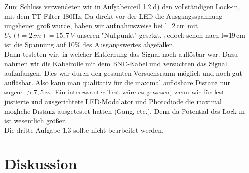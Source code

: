 \documentclass{scrartcl}						%
\begin{document}
\begin{figure}[h!t!]
			\end{figure}
			Zum Schluss verwendeten wir in Aufgabenteil 1.2.d) den vollständigen Lock-in, mit dem TT-Filter 180Hz. Da direkt vor der LED die Ausgangsspannung ungeheuer groß wurde, haben wir außnahmsweise bei l=2\,cm mit $ U_2(l=2cm)=15,7\,V $ unseren "Nullpunkt" gesetzt. Jedoch schon nach l=19\,cm ist die Spannung auf 10\% des Ausgangswertes abgefallen. \\
			Dann testeten wir, in welcher Entfernung das Signal noch auflösbar war. Dazu nahmen wir die Kabelrolle mit dem BNC-Kabel und versuchten das Signal aufzufangen. Dies war durch den gesamten Versuchsraum möglich und noch gut auflösbar. Also kann man qualitativ für die maximal auflösbare Distanz nur sagen: $ >7,5\,m $. Ein interessanter Test wäre es gewesen, wenn wir für fest-justierte und ausgerichtete LED-Modulator und Photodiode die maximal mögliche Distanz ausgetestet hätten (Gang, etc.). Denn da Potential des Lock-in ist wesentlich größer.\newline
			\\
			Die dritte Aufgabe 1.3 sollte nicht bearbeitet werden.
			
	\clearpage

\section{Diskussion}
\end{document}
